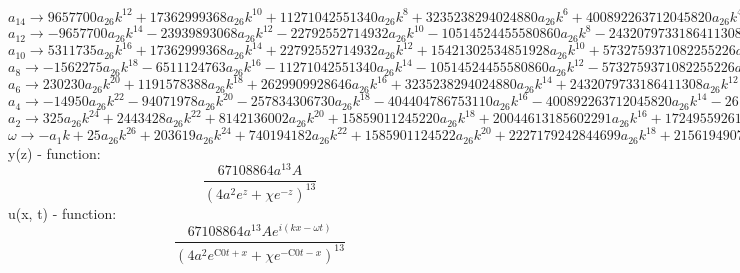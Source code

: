 \documentclass[12pt,a4paper,draft]{article}
\begin{document}
$a_{14}\to 9657700 a_{26} k^{12}+17362999368 a_{26} k^{10}+11271042551340 a_{26} k^8+3235238294024880 a_{26} k^6+400892263712045820 a_{26} k^4+17249559261491873160 a_{26} k^2+113281611928965609972 a_{26}$\\
$a_{12}\to -9657700 a_{26} k^{14}-23939893068 a_{26} k^{12}-22792552714932 a_{26} k^{10}-10514524455580860 a_{26} k^8-2432079733186411308 a_{26} k^6-261618315465960076260 a_{26} k^4-10308626685535870507452 a_{26} k^2-64833290426791693735188 a_{26}$\\
$a_{10}\to 5311735 a_{26} k^{16}+17362999368 a_{26} k^{14}+22792552714932 a_{26} k^{12}+15421302534851928 a_{26} k^{10}+5732759371082255226 a_{26} k^8+1151120588050224335544 a_{26} k^6+113394893540894575581972 a_{26} k^4+4278997168168251786522408 a_{26} k^2+26909157364413628487178567 a_{26}$\\
$a_{8}\to -1562275 a_{26} k^{18}-6511124763 a_{26} k^{16}-11271042551340 a_{26} k^{14}-10514524455580860 a_{26} k^{12}-5732759371082255226 a_{26} k^{10}-1850015230795003396410 a_{26} k^8-340184680622683726745916 a_{26} k^6-32092478761261888398918060 a_{26} k^4-1210912081398613281923035515 a_{26} k^2-7988017750729673281619483203 a_{26}$\\
$a_{6}\to 230230 a_{26} k^{20}+1191578388 a_{26} k^{18}+2629909928646 a_{26} k^{16}+3235238294024880 a_{26} k^{14}+2432079733186411308 a_{26} k^{12}+1151120588050224335544 a_{26} k^{10}+340184680622683726745916 a_{26} k^8+59905960354355525011313712 a_{26} k^6+5650923046526861982307499070 a_{26} k^4+223664497020430851885345529684 a_{26} k^2+1646018022725525727859018749246 a_{26}$\\
$a_{4}\to -14950 a_{26} k^{22}-94071978 a_{26} k^{20}-257834306730 a_{26} k^{18}-404404786753110 a_{26} k^{16}-400892263712045820 a_{26} k^{14}-261618315465960076260 a_{26} k^{12}-113394893540894575581972 a_{26} k^{10}-32092478761261888398918060 a_{26} k^8-5650923046526861982307499070 a_{26} k^6-559161242551077129713363824210 a_{26} k^4-24690270340882885917885281238690 a_{26} k^2-222621402054499124070801244657950 a_{26}$\\
$a_{2}\to 325 a_{26} k^{24}+2443428 a_{26} k^{22}+8142136002 a_{26} k^{20}+15859011245220 a_{26} k^{18}+20044613185602291 a_{26} k^{16}+17249559261491873160 a_{26} k^{14}+10308626685535870507452 a_{26} k^{12}+4278997168168251786522408 a_{26} k^{10}+1210912081398613281923035515 a_{26} k^8+223664497020430851885345529684 a_{26} k^6+24690270340882885917885281238690 a_{26} k^4+1335728412326994744424807467947700 a_{26} k^2+17686015478232327525789910529038125 a_{26}$\\
$\omega \to -a_{1} k+25 a_{26} k^{26}+203619 a_{26} k^{24}+740194182 a_{26} k^{22}+1585901124522 a_{26} k^{20}+2227179242844699 a_{26} k^{18}+2156194907686484145 a_{26} k^{16}+1472660955076552929636 a_{26} k^{14}+713166194694708631087068 a_{26} k^{12}+242182416279722656384607103 a_{26} k^{10}+55916124255107712971336382421 a_{26} k^8+8230090113627628639295093746230 a_{26} k^6+667864206163497372212403733973850 a_{26} k^4+17686015478232327525789910529038125 a_{26} k^2-622390384678166111039803771391015625 a_{26}$\\


y(z) - function:
$$
\frac{67108864 a^{13} A}{\left(4 a^2 e^z+\chi  e^{-z}\right)^{13}}
$$
u(x, t) - function:
$$
\frac{67108864 a^{13} A e^{i (k x-\omega  t)}}{\left(4 a^2 e^{\text{C0} t+x}+\chi  e^{-\text{C0} t-x}\right)^{13}}
$$
\end{document}
